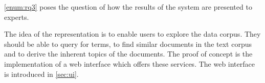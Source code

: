 \ref{enum:rq3} poses the question of how the results of the system are presented to experts.

The idea of the representation is to enable users to explore the data corpus.
They should be able to query for terms,
to find similar documents in the text corpus and 
to derive the inherent topics of the documents.
The proof of concept is the implementation of a web interface which offers these services.
The web interface is introduced in \autoref{sec:ui}.